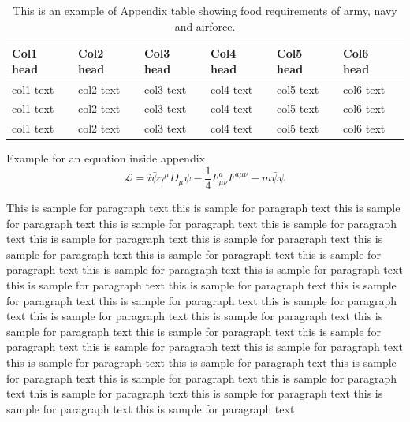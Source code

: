 \documentclass[AMA,Times1COL]{WileyNJDv5} %
\begin{document}
\begin{table}[t]%
\centering
\caption{This is an example of Appendix table showing food requirements of army, navy and airforce.\label{tab4}}%
\begin{tabular*}{\textwidth}{@{\extracolsep\fill}llllll@{\extracolsep\fill}}%
\toprule
\textbf{Col1 head} & \textbf{Col2 head} & \textbf{Col3 head} & \textbf{Col4 head} & \textbf{Col5 head} & \textbf{Col6 head} \\
\midrule
col1 text & col2 text & col3 text & col4 text & col5 text & col6 text\\
col1 text & col2 text & col3 text & col4 text & col5 text & col6 text\\
col1 text & col2 text & col3 text& col4 text & col5 text & col6 text\\
\bottomrule
\end{tabular*}
\end{table}


Example for an equation inside appendix
\begin{equation}
{\mathcal{L}} = i \bar{\psi} \gamma^\mu D_\mu \psi - \frac{1}{4} F_{\mu\nu}^a F^{a\mu\nu} - m \bar{\psi} \psi\label{eq25}
\end{equation}

%
\vspace*{12pt}
This is sample for paragraph text this is sample for paragraph text  this is sample for paragraph text this is sample for paragraph text this is sample for paragraph text this is sample for paragraph text this is sample for paragraph text this is sample for paragraph text this is sample for paragraph text this is sample for paragraph text this is sample for paragraph text this is sample for paragraph text this is sample for paragraph text this is sample for paragraph text this is sample for paragraph text this is sample for paragraph text this is sample for paragraph text this is sample for paragraph text this is sample for paragraph text this is sample for paragraph text this is sample for paragraph text this is sample for paragraph text this is sample for paragraph text this is sample for paragraph text this is sample for paragraph text this is sample for paragraph text this is sample for paragraph text this is sample for paragraph text this is sample for paragraph text this is sample for paragraph text this is sample for paragraph text this is sample for paragraph text this is sample for paragraph text
\end{document}
